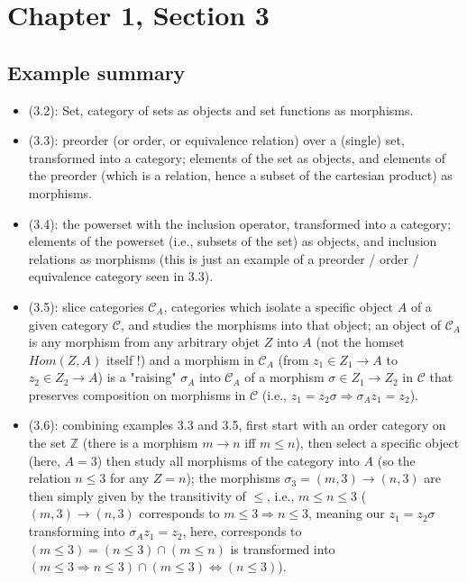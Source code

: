 \chapter*{Chapter 1, Section 3}

\section*{Example summary}

\begin{itemize}
	\item (3.2): Set, category of sets as objects and set functions as morphisms.
	\item (3.3): preorder (or order, or equivalence relation) over a (single) set, transformed into a category; elements of the set as objects, and elements of the preorder (which is a relation, hence a subset of the cartesian product) as morphisms.
	\item (3.4): the powerset with the inclusion operator, transformed into a category; elements of the powerset (i.e., subsets of the set) as objects, and inclusion relations as morphisms (this is just an example of a preorder / order / equivalence category seen in 3.3).
	\item (3.5): slice categories $\mathcal{C}_A$, categories which isolate a specific object $A$ of a given category $\mathcal{C}$, and studies the morphisms into that object; an object of $\mathcal{C}_A$ is any morphism from any arbitrary objet $Z$ into $A$ (not the homset $Hom(Z, A)$ itself !) and a morphism in $\mathcal{C}_A$ (from $z_1 \in Z_1 \to A$ to $z_2 \in Z_2 \to A$) is a "raising" $\sigma_A$ into $\mathcal{C}_A$ of a morphism $\sigma \in Z_1 \to Z_2$ in $\mathcal{C}$ that preserves composition on morphisms in $\mathcal{C}$ (i.e., $z_1 = z_2 \sigma \Rightarrow \sigma_A z_1 = z_2$).
	\item (3.6): combining examples 3.3 and 3.5, first start with an order category on the set $\mathbb{Z}$ (there is a morphism $m \to n$ iff $m \leq n$), then select a specific object (here, $A = 3$) then study all morphisms of the category into $A$ (so the relation $n \leq 3$ for any $Z = n$); the morphisms $\sigma_3 = (m, 3) \to (n, 3)$ are then simply given by the transitivity of $\leq$, i.e., $m \leq n \leq 3$ ($(m, 3) \to (n, 3)$ corresponds to $m \leq 3 \Rightarrow n \leq 3$, meaning our $z_1 = z_2 \sigma$ transforming into $\sigma_A z_1 = z_2$, here, corresponds to $(m \leq 3) = (n \leq 3) \cap (m \leq n)$ is transformed into $(m \leq 3 \Rightarrow n \leq 3) \cap (m \leq 3) \Leftrightarrow (n \leq 3)$).

\end{itemize}
